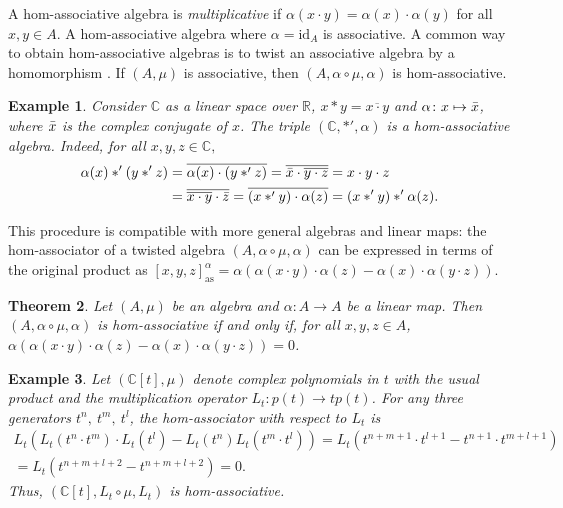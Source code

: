 \documentclass[12pt]{article}
\newtheorem{theorem}{Theorem}
\newtheorem{example}[theorem]{Example}
\begin{document}
		A hom-associative algebra is \textit{multiplicative} if  $\alpha(x\cdot y)=\alpha(x)\cdot \alpha(y)$ for all $x,y\in A$. A hom-associative algebra where $\alpha=\mathrm{id}_A$ is associative. A common way to obtain hom-associative algebras is to twist an associative algebra by a homomorphism \cite[Theorem 2.3]{Yau:HAhomology}. If $(A,\mu)$ is associative, then $(A,\alpha\circ\mu,\alpha)$ is hom-associative.
		\begin{example}
			Consider $\mathbb{C}$ as a linear space over $\mathbb{R}$, $x\ast y=\overline{x\cdot y}$ and $\alpha\colon x\mapsto \Bar{x}$, where $\Bar{x}$ is the complex conjugate of $x$. The triple $(\mathbb{C},\ast',\alpha)$ is a hom-associative algebra. Indeed, for all $x,y,z\in\mathbb{C},$
			\begin{align*}
				\alpha(x)\ast'(y\ast' z) &=\overline{\alpha(x)\cdot(y\ast' z)} =\overline{\Bar{x}\cdot \overline{{y\cdot z}}}=x\cdot y\cdot z
				\\
				& =\overline{\overline{x\cdot y}\cdot{\Bar{z}}}  =\overline{(x\ast' y)\cdot\alpha(z)}=(x\ast' y)\ast'\alpha(z).
			\end{align*}
		\end{example}
		
		This procedure is compatible with more general algebras and linear maps: the hom-associator of a twisted algebra $(A,\alpha\circ\mu,\alpha)$ can be expressed in terms of the original product as $[x,y,z]_{\mathrm{as}}^\alpha=\alpha(\alpha(x\cdot y)\cdot \alpha(z)-\alpha(x)\cdot \alpha(y\cdot z))$.
		\begin{theorem}
			Let $(A,\mu)$ be an algebra and $\alpha\colon A\rightarrow A$ be a linear map. Then $(A,\alpha\circ\mu,\alpha)$ is hom-associative if and only if, for all $x,y,z\in A$, $\alpha(\alpha(x\cdot y)\cdot \alpha(z)-\alpha(x)\cdot \alpha(y\cdot z))=0$.
		\end{theorem}
		
		\begin{example}
			Let $(\mathbb{C}[t],\mu)$ denote complex polynomials in $t$ with the usual product and the multiplication operator $L_t\colon p(t)\rightarrow tp(t)$. For any three generators $t^n,\ t^m,\ t^l$, the hom-associator with respect to $L_t$ is
			\begin{multline*}
				L_t(L_t(t^n\cdot t^m)\cdot L_t(t^l)-L_t(t^n)L_t(t^m\cdot t^l))=L_t(t^{n+m+1}\cdot t^{l+1}-t^{n+1}\cdot t^{m+l+1})\\
				=L_t(t^{n+m+l+2}-t^{n+m+l+2})=0.
			\end{multline*}
			Thus, $(\mathbb{C}[t],L_t\circ\mu,L_t)$ is hom-associative.
		\end{example}
		
\end{document}
